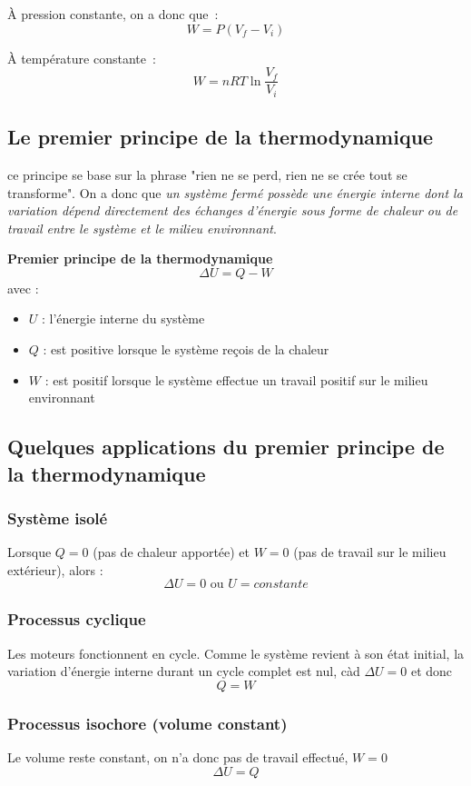 \documentclass{article}
\begin{document}
À pression constante, on a donc que :
\[W = P(V_f - V_i)\]

À température constante :
\[W = nRT\ln{\frac{V_f}{V_i}}\]

\subsection{Le premier principe de la thermodynamique}
ce principe se base sur la phrase "rien ne se perd, rien ne se crée tout se transforme".
\newline
On a donc que \textit{un système fermé possède une énergie interne dont la variation dépend directement des échanges d'énergie sous forme de chaleur ou de travail entre le système et le milieu environnant}.
\newline

\noindent
\textbf{Premier principe de la thermodynamique}
\[\Delta U = Q - W\]
avec :
\begin{itemize}
    \item $U$ : l'énergie interne du système
    \item $Q$ : est positive lorsque le système reçois de la chaleur
    \item $W$ : est positif lorsque le système effectue un travail positif sur le milieu environnant
\end{itemize}

\subsection{Quelques applications du premier principe de la thermodynamique}
\subsubsection{Système isolé}
Lorsque $Q = 0$ (pas de chaleur apportée) et $W = 0$ (pas de travail sur le milieu extérieur), alors :
\[\Delta U = 0 \text{  ou  } U = constante\] 

\subsubsection{Processus cyclique}
Les moteurs fonctionnent en cycle. Comme le système revient à son état initial, la variation d'énergie interne durant un cycle complet est nul, càd $\Delta U = 0$ et donc
\[Q = W\]

\subsubsection{Processus isochore (volume constant)}
Le volume reste constant, on n'a donc pas de travail effectué, $W = 0$
\[\Delta U = Q\]
\end{document}
